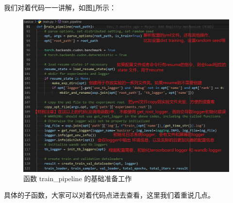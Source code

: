 \documentclass[../main.tex]{subfiles}
\begin{document}
我们对着代码一一讲解，如图\ref{fig:getting_start_train_pipeline}所示：

\begin{figure}[ht]
    \begin{center}
        \vspace{-0.2cm}
        \includegraphics[width=0.9\linewidth]{figures/getting_start_train_pipeline.png}
        \vspace{-0.3cm}
        \caption{函数 train\_pipeline 的基础准备工作}
        \label{fig:getting_start_train_pipeline}
    \end{center}
    \vspace{-0.5cm}
\end{figure}

具体的子函数，大家可以对着代码点进去查看，这里我们着重说几点。
\end{document}
